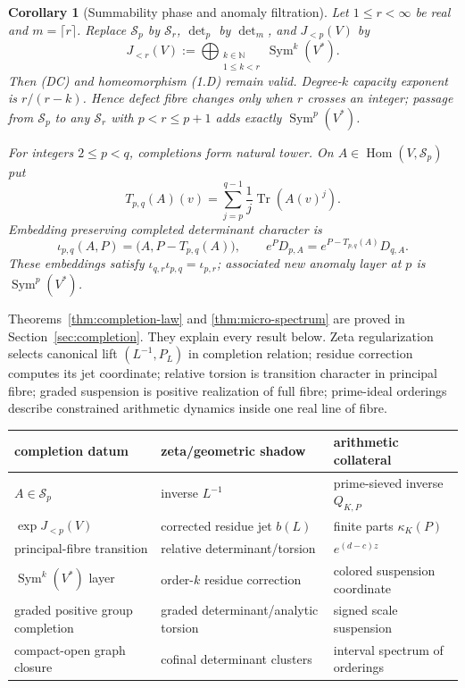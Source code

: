 \documentclass[11pt]{article}
\newtheorem{corollary}[theorem]{Corollary}
\theoremstyle{definition}
\theoremstyle{remark}
\newcommand{\N}{\mathbb N}
\newcommand{\Tr}{\operatorname{Tr}}
\begin{document}
\begin{corollary}[Summability phase and anomaly filtration]
\label{cor:summability-phase}
Let $1\leq r<\infty$ be real and $m=\lceil r\rceil$.  Replace $\mathcal S_p$ by
$\mathcal S_r$, $\det_p$ by $\det_m$, and $J_{<p}(V)$ by
\[
 J_{<r}(V):=\bigoplus_{\substack{k\in\N\\1\leq k<r}}
 \operatorname{Sym}^k(V^*).
\]
Then (DC) and homeomorphism (1.D) remain valid.  Degree-$k$ capacity exponent is
$r/(r-k)$.  Hence defect fibre changes only when $r$ crosses an integer; passage from
$\mathcal S_p$ to any $\mathcal S_r$ with $p<r\leq p+1$ adds exactly
$\operatorname{Sym}^p(V^*)$.

For integers $2\leq p<q$, completions form natural tower.  On
$A\in\operatorname{Hom}(V,\mathcal S_p)$ put
\[
 T_{p,q}(A)(v)=\sum_{j=p}^{q-1}\frac1j\Tr(A(v)^j).
\]
Embedding preserving completed determinant character is
\begin{equation}
 \iota_{p,q}(A,P)=\bigl(A,P-T_{p,q}(A)\bigr),\qquad
 e^P D_{p,A}=e^{P-T_{p,q}(A)}D_{q,A}.                    \tag{1.S}
\end{equation}
These embeddings satisfy $\iota_{q,r}\iota_{p,q}=\iota_{p,r}$; associated new anomaly layer at
$p$ is $\operatorname{Sym}^p(V^*)$.
\end{corollary}

Theorems~\ref{thm:completion-law} and \ref{thm:micro-spectrum} are proved in
Section~\ref{sec:completion}.  They explain every result below.  Zeta regularization selects
canonical lift $(L^{-1},P_L)$ in completion relation; residue correction computes its jet
coordinate; relative torsion is transition character in principal fibre; graded suspension is
positive realization of full fibre; prime-ideal orderings describe constrained arithmetic
dynamics inside one real line of fibre.

\begin{center}
\small
\begin{tabular}{p{}p{}p{}}
\toprule
completion datum & zeta/geometric shadow & arithmetic collateral\\
\midrule
$A\in\mathcal S_p$ & inverse $L^{-1}$ & prime-sieved inverse $Q_{K,P}$\\
$\exp J_{<p}(V)$ & corrected residue jet $b(L)$ & finite parts $\kappa_K(P)$\\
principal-fibre transition & relative determinant/torsion & $e^{(d-c)z}$\\
$\operatorname{Sym}^k(V^*)$ layer & order-$k$ residue correction & colored suspension coordinate\\
graded positive group completion & graded determinant/analytic torsion & signed scale suspension\\
compact-open graph closure & cofinal determinant clusters & interval spectrum of orderings\\
\bottomrule
\end{tabular}
\end{center}
\end{document}
